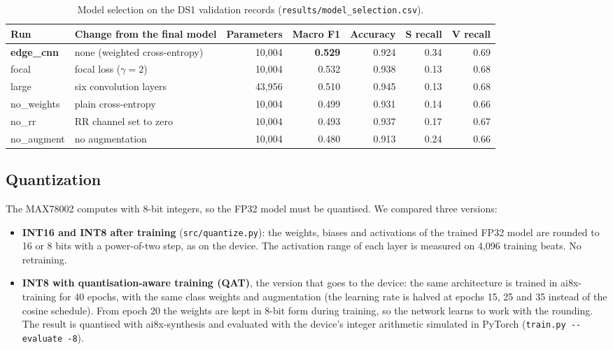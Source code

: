 \documentclass[11pt,a4paper]{article}
\newcommand{\code}[1]{\texttt{#1}}
\begin{document}
\begin{table}[H]
\centering
\small
\caption{Model selection on the DS1 validation records (\code{results/model\_selection.csv}).}
\label{tab:selection}
\begin{tabular}{@{} l l r r r r r @{}}
\toprule
Run & Change from the final model & Parameters & Macro F1 & Accuracy & S recall & V recall \\
\midrule
\textbf{edge\_cnn} & none (weighted cross-entropy) & 10,004 & \textbf{0.529} & 0.924 & 0.34 & 0.69 \\
focal & focal loss ($\gamma = 2$) & 10,004 & 0.532 & 0.938 & 0.13 & 0.68 \\
large & six convolution layers & 43,956 & 0.510 & 0.945 & 0.13 & 0.68 \\
no\_weights & plain cross-entropy & 10,004 & 0.499 & 0.931 & 0.14 & 0.66 \\
no\_rr & RR channel set to zero & 10,004 & 0.493 & 0.937 & 0.17 & 0.67 \\
no\_augment & no augmentation & 10,004 & 0.480 & 0.913 & 0.24 & 0.66 \\
\bottomrule
\end{tabular}
\end{table}

\subsection{Quantization}
\label{sec:quant}

The MAX78002 computes with 8-bit integers, so the FP32 model must be quantised. We compared three versions:

\begin{itemize}
  \item \textbf{INT16 and INT8 after training} (\code{src/quantize.py}): the weights, biases and activations of the trained FP32 model are rounded to 16 or 8 bits with a power-of-two step, as on the device. The activation range of each layer is measured on 4,096 training beats. No retraining.
  \item \textbf{INT8 with quantisation-aware training (QAT)}, the version that goes to the device: the same architecture is trained in ai8x-training for 40 epochs, with the same class weights and augmentation (the learning rate is halved at epochs 15, 25 and 35 instead of the cosine schedule). From epoch 20 the weights are kept in 8-bit form during training, so the network learns to work with the rounding. The result is quantised with ai8x-synthesis and evaluated with the device's integer arithmetic simulated in PyTorch (\code{train.py -{}-evaluate -8}).
\end{itemize}
\end{document}
